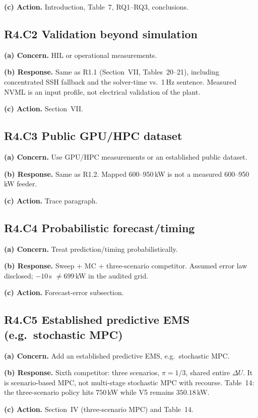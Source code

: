 \documentclass[11pt]{article}
\begin{document}
\textbf{(c) Action.} Introduction, Table~7, RQ1--RQ3, conclusions.

\subsection*{R4.C2 Validation beyond simulation}
\textbf{(a) Concern.} HIL or operational measurements.

\textbf{(b) Response.} Same as R1.1 (Section~VII, Tables~20--21), including concentrated SSH fallback and the solver-time vs.\ 1\,Hz sentence. Measured NVML is an input profile, not electrical validation of the plant.

\textbf{(c) Action.} Section~VII.

\subsection*{R4.C3 Public GPU/HPC dataset}
\textbf{(a) Concern.} Use GPU/HPC measurements or an established public dataset.

\textbf{(b) Response.} Same as R1.2. Mapped 600--950\,kW is not a measured 600--950\,kW feeder.

\textbf{(c) Action.} Trace paragraph.

\subsection*{R4.C4 Probabilistic forecast/timing}
\textbf{(a) Concern.} Treat prediction/timing probabilistically.

\textbf{(b) Response.} Sweep + MC + three-scenario competitor. Assumed error law disclosed; $-10$\,s $\neq 699$\,kW in the audited grid.

\textbf{(c) Action.} Forecast-error subsection.

\subsection*{R4.C5 Established predictive EMS (e.g.\ stochastic MPC)}
\textbf{(a) Concern.} Add an established predictive EMS, e.g.\ stochastic MPC.

\textbf{(b) Response.} Sixth competitor: three scenarios, $\pi=1/3$, shared entire $\Delta U$. It is scenario-based MPC, not multi-stage stochastic MPC with recourse. Table~14: the three-scenario policy hits $750$\,kW while V5 remains $350.18$\,kW.

\textbf{(c) Action.} Section~IV (three-scenario MPC) and Table~14.
\end{document}
